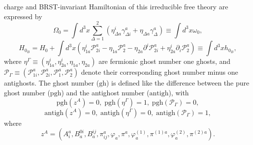 \documentclass[a4paper,12pt]{article}
\begin{document}
charge and BRST-invariant Hamiltonian of this irreducible free theory are
expressed by 
\begin{equation}
\Omega _{0}=\int d^{3}x\sum\limits_{\Delta =1}^{2}\left( \eta _{\Delta
a}^{i}\gamma _{\Delta i}^{a}+\eta _{\Delta a}\gamma _{\Delta }^{a}\right)
\equiv \int d^{3}x\omega _{0},  \label{15x}
\end{equation}
\begin{equation}
H_{0_{B}}=H_{0}+\int d^{3}x\left( \eta _{1a}^{i}\mathcal{P}_{2i}^{a}-\eta
_{1a}\mathcal{P}_{2}^{a}-\eta _{2a}\partial ^{i}\mathcal{P}_{2i}^{a}+\eta
_{2a}^{i}\partial _{i}\mathcal{P}_{2}^{a}\right) \equiv \int d^{3}xh_{0_{B}},
\label{16x}
\end{equation}
where $\eta ^{\Gamma }\equiv \left( \eta _{1a}^{i},\eta _{2a}^{i},\eta
_{1a},\eta _{2a}\right) $ are fermionic ghost number one ghosts, and $%
\mathcal{P}_{\Gamma }\equiv \left( \mathcal{P}_{1i}^{a},\mathcal{P}_{2i}^{a},%
\mathcal{P}_{1}^{a},\mathcal{P}_{2}^{a}\right) $ denote their corresponding
ghost number minus one antighosts. The ghost number ($\mathrm{gh}$) is
defined like the difference between the pure ghost number ($\mathrm{pgh}$)
and the antighost number ($\mathrm{antigh}$), with 
\begin{equation}
\mathrm{pgh}\left( z^{A}\right) =0,\;\mathrm{pgh}\left( \eta ^{\Gamma
}\right) =1,\;\mathrm{pgh}\left( \mathcal{P}_{\Gamma }\right) =0,
\label{17x}
\end{equation}
\begin{equation}
\mathrm{antigh}\left( z^{A}\right) =0,\;\mathrm{antigh}\left( \eta ^{\Gamma
}\right) =0,\;\mathrm{antigh}\left( \mathcal{P}_{\Gamma }\right) =1,
\label{18x}
\end{equation}
where 
\begin{equation}
z^{A}=\left( A_{i}^{a},B_{a}^{0i},B_{a}^{ij},\pi _{ij}^{a},\varphi _{a},\pi
^{a},\varphi _{a}^{\left( 1\right) },\pi ^{(1)a},\varphi _{a}^{\left(
2\right) },\pi ^{(2)a}\right) .  \label{19x}
\end{equation}
\end{document}
